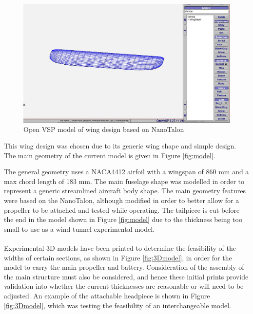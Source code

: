 \begin{figure}[H]
    \centering
    \includegraphics[width=\linewidth]{04_Progress/Figs/openVSp.JPG}
    \caption{Open VSP model of wing design based on NanoTalon \cite{NanoTalon}}
    \label{fig:openVSP}
\end{figure}

This wing design was chosen due to its generic wing shape and simple design. The main geometry of the current model is given in Figure \ref{fig:model}.



The general geometry uses a NACA4412 airfoil with a wingspan of 860 mm and a max chord length of 183 mm. The main fuselage shape was modelled in order to represent a generic streamlined aircraft body shape. The main geometry features were based on the NanoTalon, although modified in order to better allow for a propeller to be attached and tested while operating. The tailpiece is cut before the end in the model shown in Figure \ref{fig:model} due to the thickness being too small to use as a wind tunnel experimental model.\\
\\
Experimental 3D models have been printed to determine the feasibility of the widths of certain sections, as shown in Figure \ref{fig:3Dmodel}, in order for the model to carry the main propeller and battery. Consideration of the assembly of the main structure must also be considered, and hence these initial prints provide validation into whether the current thicknesses are reasonable or will need to be adjusted. An example of the attachable headpiece is shown in Figure \ref{fig:3Dmodel}, which was testing the feasibility of an interchangeable model. 


